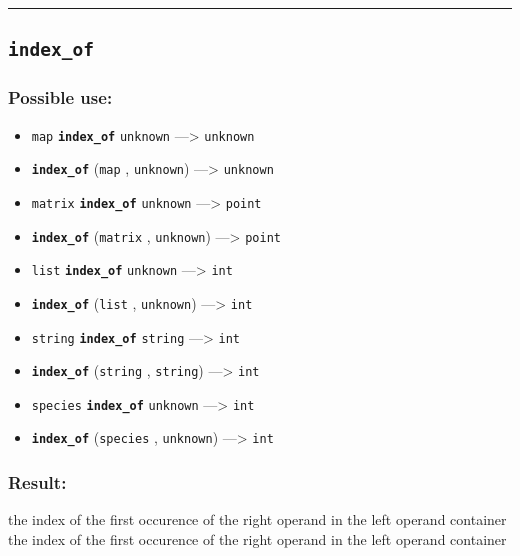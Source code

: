 \documentclass[]{book}
\providecommand{\tightlist}{%
  \setlength{\itemsep}{0pt}\setlength{\parskip}{0pt}}
\theoremstyle{definition}
\theoremstyle{definition}
\theoremstyle{definition}
\theoremstyle{remark}
\begin{document}
\begin{center}\rule{0.5\linewidth}{\linethickness}\end{center}

\subsection{\texorpdfstring{\texttt{index\_of}}{index\_of}}\label{index_of}

\subsubsection{Possible use:}\label{possible-use-274}

\begin{itemize}
\tightlist
\item
  \texttt{map} \textbf{\texttt{index\_of}} \texttt{unknown}
  ---\textgreater{} \texttt{unknown}
\item
  \textbf{\texttt{index\_of}} (\texttt{map} , \texttt{unknown})
  ---\textgreater{} \texttt{unknown}
\item
  \texttt{matrix} \textbf{\texttt{index\_of}} \texttt{unknown}
  ---\textgreater{} \texttt{point}
\item
  \textbf{\texttt{index\_of}} (\texttt{matrix} , \texttt{unknown})
  ---\textgreater{} \texttt{point}
\item
  \texttt{list} \textbf{\texttt{index\_of}} \texttt{unknown}
  ---\textgreater{} \texttt{int}
\item
  \textbf{\texttt{index\_of}} (\texttt{list} , \texttt{unknown})
  ---\textgreater{} \texttt{int}
\item
  \texttt{string} \textbf{\texttt{index\_of}} \texttt{string}
  ---\textgreater{} \texttt{int}
\item
  \textbf{\texttt{index\_of}} (\texttt{string} , \texttt{string})
  ---\textgreater{} \texttt{int}
\item
  \texttt{species} \textbf{\texttt{index\_of}} \texttt{unknown}
  ---\textgreater{} \texttt{int}
\item
  \textbf{\texttt{index\_of}} (\texttt{species} , \texttt{unknown})
  ---\textgreater{} \texttt{int}
\end{itemize}

\subsubsection{Result:}\label{result-264}

the index of the first occurence of the right operand in the left
operand container the index of the first occurence of the right operand
in the left operand container
\end{document}
